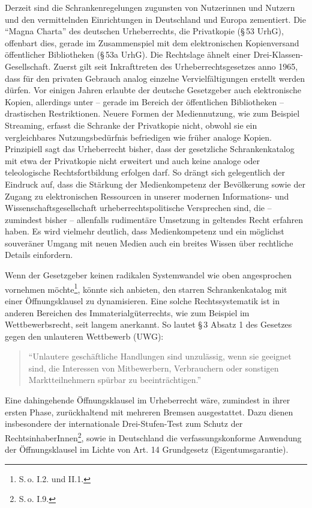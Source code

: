 \documentclass[output=paper]{langscibook}
\begin{document}
Derzeit sind die Schrankenregelungen zugunsten von Nutzerinnen und
Nutzern und den vermittelnden Einrichtungen in Deutschland und Europa
zementiert. Die \enquote{Magna Charta} des deutschen Urheberrechts, die
Privatkopie (§\,53 UrhG), offenbart dies, gerade im Zusammenspiel mit dem
elektronischen Kopienversand öffentlicher Bibliotheken (§\,53a UrhG). Die
Rechtslage ähnelt einer Drei-Klassen-Gesellschaft. Zuerst gilt seit
Inkrafttreten des Urheberrechtsgesetzes anno 1965, dass für den privaten
Gebrauch analog einzelne Vervielfältigungen erstellt werden dürfen. Vor
einigen Jahren erlaubte der deutsche Gesetzgeber auch elektronische
Kopien, allerdings unter -- gerade im Bereich der öffentlichen
Bibliotheken -- drastischen Restriktionen. Neuere Formen der
Mediennutzung, wie zum Beispiel Streaming, erfasst die Schranke der
Privatkopie nicht, obwohl sie ein vergleichbares Nutzungsbedürfnis
befriedigen wie früher analoge Kopien. Prinzipiell sagt das Urheberrecht
bisher, dass der gesetzliche Schrankenkatalog mit etwa der Privatkopie
nicht erweitert und auch keine analoge oder teleologische
Rechtsfortbildung erfolgen darf. So drängt sich gelegentlich der
Eindruck auf, dass die Stärkung der Medienkompetenz der Bevölkerung
sowie der Zugang zu elektronischen Ressourcen in unserer modernen
Informations- und Wissenschaftsgesellschaft urheberrechtspolitische
Versprechen sind, die -- zumindest bisher -- allenfalls rudimentäre
Umsetzung in geltendes Recht erfahren haben. Es wird vielmehr deutlich,
dass Medienkompetenz und ein möglichst souveräner Umgang mit neuen
Medien auch ein breites Wissen über rechtliche Details einfordern.

Wenn der Gesetzgeber keinen radikalen Systemwandel wie oben angesprochen
vornehmen möchte\footnote{S.\,o. I.2. und II.1.}, könnte sich anbieten,
den starren Schrankenkatalog mit einer Öffnungsklausel zu dynamisieren.
Eine solche Rechtssystematik ist in anderen Bereichen des
Immaterialgüterrechts, wie zum Beispiel im Wettbewerbsrecht, seit langem
anerkannt. So lautet §\,3 Absatz 1 des Gesetzes gegen den unlauteren
Wettbewerb (UWG):

\begin{quote}
\enquote{Unlautere geschäftliche Handlungen sind unzulässig, wenn sie
geeignet sind, die Interessen von Mitbewerbern, Verbrauchern oder
sonstigen Marktteilnehmern spürbar zu beeinträchtigen.}
\end{quote}

Eine dahingehende Öffnungsklausel im Urheberrecht wäre, zumindest in
ihrer ersten Phase, zurückhaltend mit mehreren Bremsen ausgestattet.
Dazu dienen insbesondere der internationale Drei-Stufen-Test zum Schutz
der RechtsinhaberInnen\footnote{S.\,o. I.9.}, sowie in Deutschland die
verfassungskonforme Anwendung der Öffnungsklausel im Lichte von Art. 14
Grundgesetz (Eigentumsgarantie).
\end{document}
